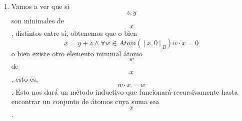 \begin{enumerate}
\begin{enumerate}
\begin{enumerate}
\begin{enumerate}
\begin{enumerate}
\begin{enumerate}
            \begin{enumerate}
            \def\labelenumvii{\arabic{enumvii}.}
            \tightlist
            \item
              \[{{{z \cdot {({x + y})}} = {{({z \cdot x})} + {({z \cdot y})}}} = {0 + 0}} = 0\]
            \item
              \[{{({x + y})} + z} = 1\]
            \item
              \[{z = \overline{x+y}}\mathit{ABSURDO}\]
            \item
              \[\forall{z \in B}{z \in {({B_{2}@{\mathit{Atom}{(B)}}@{\mathit{Htom}{(B)}}})}}\]
            \item
              \[\#{{(B)} = 8}\]
            \end{enumerate}
          \end{enumerate}
        \end{enumerate}
      \item
        Todos las álgebras de Boole finitas de cardinal 8 son isomorfas
        entre sí. Por lo visto hasta ahora, queda
        \[{B = \underset{B_{2}}{\underbrace{\{ 0,1\}}}}@\underset{\mathit{Atom}{(B)}}{\underbrace{\{{a,b,\overline{a+b}}\}}}@\underset{\mathit{Htom}{(B)}}{\underbrace{\{{\overline{a},\overline{b},{a + b}}\}}}\]y
        si tenemos un segundo conjunto de Boole talque

        \[B{' = \underset{B'_{2}}{\underbrace{\{{0',1'}\}}}}@\underset{\mathit{Atom}{({B'})}}{\underbrace{\{{a',b',\overline{a'+_{2}b'}}\}}}@\underset{\mathit{Htom}{({B'})}}{\underbrace{\{{\overline{a},\overline{b},{a +_{2}b}}\}}}\]basta
        con construir el siguiente isomorfismo:

        \[\varphi:{B\rightarrow B}'::x\mapsto\varphi{(x)} ≝ \begin{Bmatrix}
        {0'\Leftarrow{x = 0}} \\
        {1'\Leftarrow{x = 1}} \\
        {a'\Leftarrow{x = a}} \\
        {b'\Leftarrow{x = b}} \\
        {\overline{a'+_{2}b'}\Leftarrow{x = \overline{a+b}}} \\
        {\overline{a'}\Leftarrow{x = \overline{a}}} \\
        {\overline{b'}\Leftarrow{x = \overline{b}}} \\
        {\overline{a'+_{2}b'}\Leftarrow{x = {a + b}}}
        \end{Bmatrix}\]
      \end{enumerate}
    \item
      Vamos a ver que si \[z,y\] son minimales de \[x\], distintos entre
      sí, obtenemos que o bien
      \[{x = {y + z}}{\land}\forall{w \in \mathit{Atom}}{(\left\lbrack {x,0} \right\rbrack_{B})}{{w \cdot x} = 0}\]
      o bien existe otro elemento minimal átomo \[w\] de \[x\], esto es,
      \[{w \cdot x} = w\]. Esto nos dará un método inductivo que
      funcionará recursivamente hasta encontrar un conjunto de átomos
      cuya suma sea \[x\].


\end{enumerate}
\end{enumerate}
\end{enumerate}

